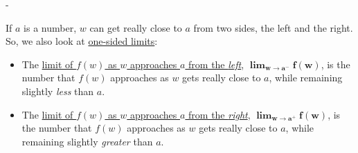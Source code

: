 \documentclass{article}
\makeatletter
\newlength{\tipmargin}
\renewenvironment{framed}{
  \setlength{\tipmargin}{\textwidth-\linewidth}
  \advance\@totalleftmargin-\tipmargin
  \def\FrameCommand{\hspace{\tipmargin}\fbox}%
  \advance\linewidth\tipmargin
  \MakeFramed {\advance\hsize-\width \FrameRestore}%
}
{\endMakeFramed}
\makeatother
\begin{document}
\begin{framed}
  If $a$ is a number, $w$ can get really close to $a$ from two sides, the
  left and the right.  So, we also look at \uline{one-sided limits}:
  \begin{itemize}[topsep=0pt]

  \item The \uline{limit of $f(w)$ as $w$ approaches $a$ from the
      \emph{left}}, $\displaystyle \bm{\lim_{w \to a^-} f(w)}$, is the
    number that $f(w)$ approaches as $w$ gets really close to $a$, while
    remaining slightly \emph{less} than $a$.

  \item The \uline{limit of $f(w)$ as $w$ approaches $a$ from the
      \emph{right}}, $\displaystyle \bm{\lim_{w \to a^+} f(w)}$, is the
    number that $f(w)$ approaches as $w$ gets really close to $a$, while
    remaining slightly \emph{greater} than $a$.

  \end{itemize}
\end{framed}
\end{document}
